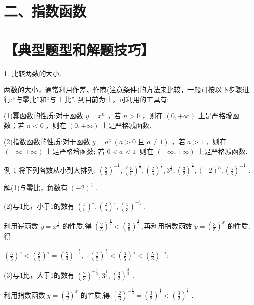 \documentclass[10pt]{article}
\begin{document}
\section*{二、指数函数}

\section*{【典型题型和解题技巧】}

1. 比较两数的大小.

两数的大小，通常利用作差、作商(注意条件)的方法来比较，一般可按以下步骤进行:“与零比”和“与 1 比”. 到目前为止，可利用的工具有:

(1)幂函数的性质:对于函数 \(y = {x}^{n}\) ，若 \(n > 0\) ，则在 \(\left( {0, + \infty }\right)\) 上是严格增函数；若 \(n < 0\) ，则在 \(\left( {0, + \infty }\right)\) 上是严格减函数.

(2)指数函数的性质:对于函数 \(y = {a}^{x}\;\left( {a > 0\text{ 且 }a \neq  1}\right)\) ，若 \(a > 1\) ，则在 \(\left( {-\infty , + \infty }\right)\) 上是严格增函数; 若 \(0 < a < 1\) ,则在 \(\left( {-\infty , + \infty }\right)\) 上是严格减函数.

例 1 将下列各数从小到大排列: \({\left( \frac{2}{3}\right) }^{-\frac{1}{3}},{\left( \frac{3}{5}\right) }^{\frac{1}{2}},{\left( \frac{2}{5}\right) }^{\frac{1}{2}},{3}^{\frac{1}{3}},{\left( \frac{3}{2}\right) }^{\frac{2}{3}},{\left( -2\right) }^{3},{\left( \frac{5}{3}\right) }^{-\frac{1}{3}}\) .

解(1)与零比，负数有 \({\left( -2\right) }^{3}\) .

(2)与1比，小于1的数有 \({\left( \frac{3}{5}\right) }^{\frac{1}{2}},{\left( \frac{2}{5}\right) }^{\frac{1}{2}},{\left( \frac{5}{3}\right) }^{-\frac{1}{3}}\) .

利用幂函数 \(y = {x}^{\frac{1}{2}}\) 的性质,得 \({\left( \frac{2}{5}\right) }^{\frac{1}{2}} < {\left( \frac{3}{5}\right) }^{\frac{1}{2}}\) ,再利用指数函数 \(y = {\left( \frac{3}{5}\right) }^{x}\) 的性质,得

\({\left( \frac{3}{5}\right) }^{\frac{1}{2}} < {\left( \frac{3}{5}\right) }^{\frac{1}{3}} = {\left( \frac{5}{3}\right) }^{-\frac{1}{3}},\;\therefore {\left( \frac{2}{5}\right) }^{\frac{1}{2}} < {\left( \frac{3}{5}\right) }^{\frac{1}{2}} < {\left( \frac{5}{3}\right) }^{-\frac{1}{3}};\)

(3)与1比，大于1的数有 \({\left( \frac{2}{3}\right) }^{-\frac{1}{3}},{3}^{\frac{1}{3}},{\left( \frac{3}{2}\right) }^{\frac{2}{3}}\) .

利用指数函数 \(y = {\left( \frac{3}{2}\right) }^{x}\) 的性质,得 \({\left( \frac{2}{3}\right) }^{-\frac{1}{3}} = {\left( \frac{3}{2}\right) }^{\frac{1}{3}} < {\left( \frac{3}{2}\right) }^{\frac{2}{3}}\) .
\end{document}
